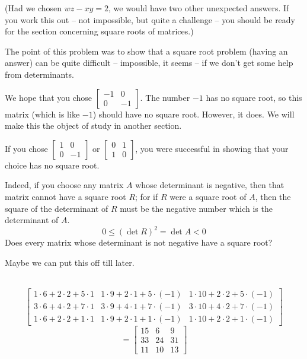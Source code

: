 \documentclass{article}
\begin{document}
\begin{description}
    (Had we chosen $wz-xy=2$, we would have two other unexpected answers. If you work this out -- not impossible, but quite a challenge -- you should be ready for the section concerning square roots of matrices.)

    The point of this problem was to show that a square root problem (having an answer) can be quite difficult -- impossible, it seems -- if we don't get some help from determinants.

  \item[76.] We hope that you chose $\begin{bmatrix} -1 & 0 \\ 0 & -1 \end{bmatrix}$. The number $-1$ has no square root, so this matrix (which is like $-1$) should have no square root. However, it does. We will make this the object of study in another section.

    If you chose $\begin{bmatrix} 1 & 0 \\ 0 & -1 \end{bmatrix}$ or $\begin{bmatrix} 0 & 1 \\ 1 & 0 \end{bmatrix}$, you were successful in showing that your choice has no square root.

    Indeed, if you choose any matrix $A$ whose determinant is negative, then that matrix cannot have a square root $R$; for if $R$ were a square root of $A$, then the square of the determinant of $R$ must be the negative number which is the determinant of $A$.
    \begin{equation*}
    0 \leq (\det R)^2 = \det A < 0
    \end{equation*}
    Does every matrix whose determinant is not negative have a square root?

  \item[77.] Maybe we can put this off till later.

  \item[78.] $\ $
    \begin{equation*}
      \begin{bmatrix}
      1 \cdot 6+2 \cdot 2+5 \cdot 1 & 1 \cdot 9+2 \cdot 1+5 \cdot (-1) & 1 \cdot 10+2 \cdot 2+5 \cdot (-1) \\
      3 \cdot 6+4 \cdot 2+7 \cdot 1 & 3 \cdot 9+4 \cdot 1+7 \cdot (-1) & 3 \cdot 10+4 \cdot 2+7 \cdot (-1) \\
      1 \cdot 6+2 \cdot 2+1 \cdot 1 & 1 \cdot 9+2 \cdot 1+1 \cdot (-1) & 1 \cdot 10+2 \cdot 2+1 \cdot (-1)
      \end{bmatrix}
    \end{equation*}
    \begin{equation*}
    = \begin{bmatrix} 15 & 6 & 9 \\ 33 & 24 & 31 \\ 11 & 10 & 13 \end{bmatrix}
    \end{equation*}


\end{description}
\end{document}
